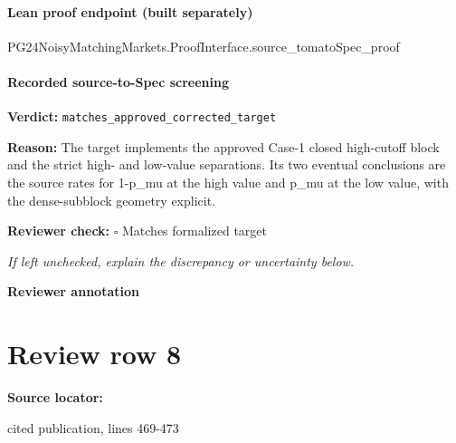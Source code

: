 \documentclass[10pt]{article}
\newcommand{\reviewerbox}{%
  \par\noindent\fbox{\parbox{0.96\linewidth}{\rule{0pt}{0.38in}}}\par
}
\newcommand{\reviewmatch}[1]{%
  \par\noindent\textbf{Reviewer check:} $\square$\; #1\par
  \noindent\emph{If left unchecked, explain the discrepancy or uncertainty below.}\par
}
\begin{document}
\paragraph{Lean proof endpoint (built separately)}\begin{ReviewVerbatim}
PG24NoisyMatchingMarkets.ProofInterface.source_tomatoSpec_proof
\end{ReviewVerbatim}

\paragraph{Recorded source-to-Spec screening}
\textbf{Verdict:} \texttt{matches\_approved\_corrected\_target}
\\
{\raggedright
\textbf{Reason:} The target implements the approved Case-\allowbreak{}1 closed high-\allowbreak{}cutoff block and the strict high-\allowbreak{} and low-\allowbreak{}value separations.\allowbreak{} Its two eventual conclusions are the source rates for 1-\allowbreak{}p\_\allowbreak{}mu at the high value and p\_\allowbreak{}mu at the low value, with the dense-\allowbreak{}subblock geometry explicit.\allowbreak{}
\par}
\reviewmatch{Matches formalized target}
\noindent\textbf{Reviewer annotation}\par
\reviewerbox
\clearpage
\hypertarget{source-claim-2f4e3f42143d1dc8}{}
\section*{Review row 8}
\textbf{Source locator:} {\footnotesize\raggedright cited publication, lines 469-\allowbreak{}473\par}
\end{document}
